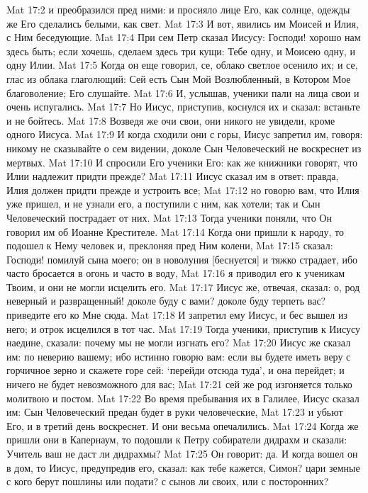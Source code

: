 Mat 17:2  и преобразился пред ними: и просияло лице Его, как солнце, одежды же Его сделались белыми, как свет.
Mat 17:3  И вот, явились им Моисей и Илия, с Ним беседующие.
Mat 17:4  При сем Петр сказал Иисусу: Господи! хорошо нам здесь быть; если хочешь, сделаем здесь три кущи: Тебе одну, и Моисею одну, и одну Илии.
Mat 17:5  Когда он еще говорил, се, облако светлое осенило их; и се, глас из облака глаголющий: Сей есть Сын Мой Возлюбленный, в Котором Мое благоволение; Его слушайте.
Mat 17:6  И, услышав, ученики пали на лица свои и очень испугались.
Mat 17:7  Но Иисус, приступив, коснулся их и сказал: встаньте и не бойтесь.
Mat 17:8  Возведя же очи свои, они никого не увидели, кроме одного Иисуса.
Mat 17:9  И когда сходили они с горы, Иисус запретил им, говоря: никому не сказывайте о сем видении, доколе Сын Человеческий не воскреснет из мертвых.
Mat 17:10  И спросили Его ученики Его: как же книжники говорят, что Илии надлежит придти прежде?
Mat 17:11  Иисус сказал им в ответ: правда, Илия должен придти прежде и устроить все;
Mat 17:12  но говорю вам, что Илия уже пришел, и не узнали его, а поступили с ним, как хотели; так и Сын Человеческий пострадает от них.
Mat 17:13  Тогда ученики поняли, что Он говорил им об Иоанне Крестителе.
Mat 17:14  Когда они пришли к народу, то подошел к Нему человек и, преклоняя пред Ним колени,
Mat 17:15  сказал: Господи! помилуй сына моего; он в новолуния [беснуется] и тяжко страдает, ибо часто бросается в огонь и часто в воду,
Mat 17:16  я приводил его к ученикам Твоим, и они не могли исцелить его.
Mat 17:17  Иисус же, отвечая, сказал: о, род неверный и развращенный! доколе буду с вами? доколе буду терпеть вас? приведите его ко Мне сюда.
Mat 17:18  И запретил ему Иисус, и бес вышел из него; и отрок исцелился в тот час.
Mat 17:19  Тогда ученики, приступив к Иисусу наедине, сказали: почему мы не могли изгнать его?
Mat 17:20  Иисус же сказал им: по неверию вашему; ибо истинно говорю вам: если вы будете иметь веру с горчичное зерно и скажете горе сей: `перейди отсюда туда', и она перейдет; и ничего не будет невозможного для вас;
Mat 17:21  сей же род изгоняется только молитвою и постом.
Mat 17:22  Во время пребывания их в Галилее, Иисус сказал им: Сын Человеческий предан будет в руки человеческие,
Mat 17:23  и убьют Его, и в третий день воскреснет. И они весьма опечалились.
Mat 17:24  Когда же пришли они в Капернаум, то подошли к Петру собиратели дидрахм и сказали: Учитель ваш не даст ли дидрахмы?
Mat 17:25  Он говорит: да. И когда вошел он в дом, то Иисус, предупредив его, сказал: как тебе кажется, Симон? цари земные с кого берут пошлины или подати? с сынов ли своих, или с посторонних?
